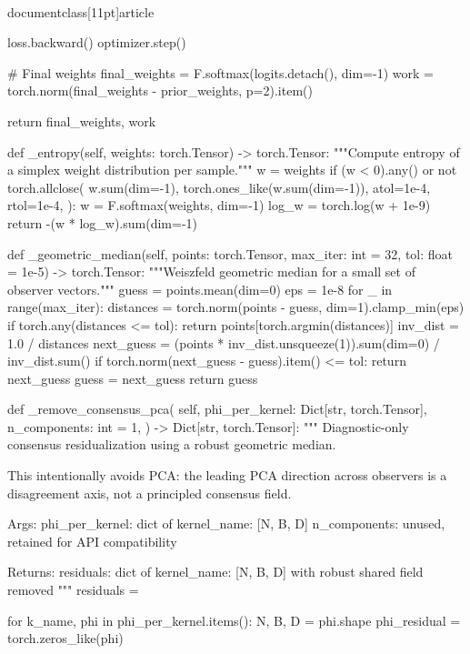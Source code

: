\\documentclass[11pt]{article}
\begin{document}
\begin{CodeBlock}
{{{{{{{{            loss.backward()
            optimizer.step()

        # Final weights
        final_weights = F.softmax(logits.detach(), dim=-1)
        work = torch.norm(final_weights - prior_weights, p=2).item()

        return final_weights, work

    def _entropy(self, weights: torch.Tensor) -> torch.Tensor:
        """Compute entropy of a simplex weight distribution per sample."""
        w = weights
        if (w < 0).any() or not torch.allclose(
            w.sum(dim=-1),
            torch.ones_like(w.sum(dim=-1)),
            atol=1e-4,
            rtol=1e-4,
        ):
            w = F.softmax(weights, dim=-1)
        log_w = torch.log(w + 1e-9)
        return -(w * log_w).sum(dim=-1)

    def _geometric_median(self, points: torch.Tensor, max_iter: int = 32, tol: float = 1e-5) -> torch.Tensor:
        """Weiszfeld geometric median for a small set of observer vectors."""
        guess = points.mean(dim=0)
        eps = 1e-8
        for _ in range(max_iter):
            distances = torch.norm(points - guess, dim=1).clamp_min(eps)
            if torch.any(distances <= tol):
                return points[torch.argmin(distances)]
            inv_dist = 1.0 / distances
            next_guess = (points * inv_dist.unsqueeze(1)).sum(dim=0) / inv_dist.sum()
            if torch.norm(next_guess - guess).item() <= tol:
                return next_guess
            guess = next_guess
        return guess

    def _remove_consensus_pca(
        self,
        phi_per_kernel: Dict[str, torch.Tensor],
        n_components: int = 1,
    ) -> Dict[str, torch.Tensor]:
        """
        Diagnostic-only consensus residualization using a robust geometric median.

        This intentionally avoids PCA: the leading PCA direction across observers is
        a disagreement axis, not a principled consensus field.

        Args:
            phi_per_kernel: dict of {kernel_name: [N, B, D]}
            n_components: unused, retained for API compatibility

        Returns:
            residuals: dict of {kernel_name: [N, B, D]} with robust shared field removed
        """
        residuals = {}

        for k_name, phi in phi_per_kernel.items():
            N, B, D = phi.shape
            phi_residual = torch.zeros_like(phi)

}}}}}}}}
\end{CodeBlock}
\end{document}

